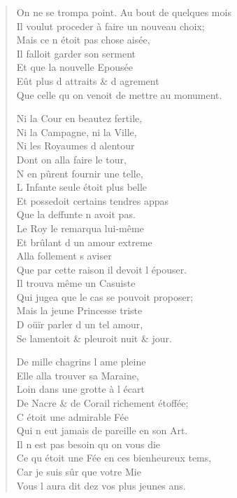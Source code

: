\documentclass[14pt,a4paper]{memoir}
\begin{document}
{{\begin{otherlanguage}{french}
\begin{verse}
On ne se trompa point. Au bout de quelques mois \\
Il voulut proceder à faire un nouveau choix; \\
\vin Mais ce n\textquotesingle{} étoit pas chose aisée, \\
\vin Il falloit garder son serment \\
\vin Et que la nouvelle Epousée \\
\vin Eût plus d\textquotesingle{} attraits \& d\textquotesingle{} agrement \\
Que celle qu\textquotesingle{} on venoit de mettre au monument.

\vin Ni la Cour en beautez fertile, \\
\vin Ni la Campagne, ni la Ville, \\
\vin Ni les Royaumes d\textquotesingle{} alentour \\
\vin Dont on alla faire le tour, \\
\vin N\textquotesingle{} en pûrent fournir une telle, \\
\vin L\textquotesingle{} Infante seule étoit plus belle \\
\vin Et possedoit certains tendres appas \\
\vin Que la deffunte n\textquotesingle{} avoit pas. \\
\vin Le Roy le remarqua lui-même \\
\vin Et brûlant d\textquotesingle{} un amour extreme \\
\vin Alla follement s\textquotesingle{} aviser \\
Que par cette raison il devoit l\textquotesingle{} épouser. \\
\vin Il trouva même un Casuiste \\
Qui jugea que le cas se pouvoit proposer; \\
\vin Mais la jeune Princesse triste \\
\vin D\textquotesingle{} oüïr parler d\textquotesingle{} un tel amour, \\
\vin Se lamentoit \& pleuroit nuit \& jour.

\vin De mille chagrins l\textquotesingle{} ame pleine \\
\vin Elle alla trouver sa Maraine, \\
\vin Loin dans une grotte à l\textquotesingle{} écart \\
De Nacre \& de Corail richement étoffée; \\
\vin C\textquotesingle{} étoit une admirable Fée \\
\vin Qui n\textquotesingle{} eut jamais de pareille en son Art. \\
\vin Il n\textquotesingle{} est pas besoin qu\textquotesingle{} on vous die \\
Ce qu\textquotesingle{} étoit une Fée en ces bienheureux tems, \\
\vin Car je suis sûr que votre Mie \\
\vin Vous l\textquotesingle{} aura dit dez vos plus jeunes ans.


\end{verse}
\end{otherlanguage}}}
\end{document}
